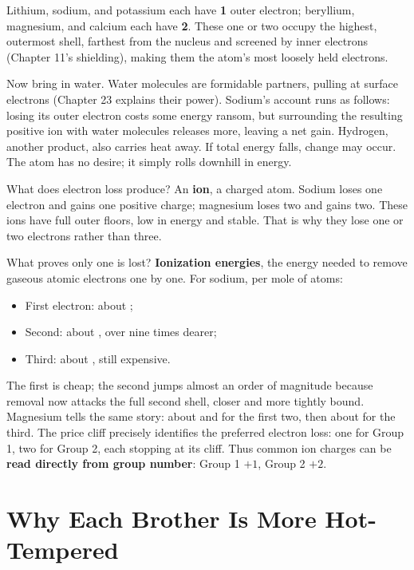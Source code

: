 Lithium, sodium, and potassium each have \textbf{1} outer electron; beryllium, magnesium, and calcium each have \textbf{2}. These one or two occupy the highest, outermost shell, farthest from the nucleus and screened by inner electrons (Chapter 11's shielding), making them the atom's most loosely held electrons.

Now bring in water. Water molecules are formidable partners, pulling at surface electrons (Chapter 23 explains their power). Sodium's account runs as follows: losing its outer electron costs some energy ransom, but surrounding the resulting positive ion with water molecules releases more, leaving a net gain. Hydrogen, another product, also carries heat away. If total energy falls, change may occur. The atom has no desire; it simply rolls downhill in energy.

What does electron loss produce? An \textbf{ion}, a charged atom. Sodium loses one electron and gains one positive charge; magnesium loses two and gains two. These ions have full outer floors, low in energy and stable. That is why they lose one or two electrons rather than three.

\begin{qiaoliang}
What proves only one is lost? \textbf{Ionization energies}, the energy needed to remove gaseous atomic electrons one by one. For sodium, per mole of atoms:
\begin{itemize}[itemsep=1pt]
\item First electron: about ;
\item Second: about , over nine times dearer;
\item Third: about , still expensive.
\end{itemize}
The first is cheap; the second jumps almost an order of magnitude because removal now attacks the full second shell, closer and more tightly bound. Magnesium tells the same story: about  and  for the first two, then about  for the third. The price cliff precisely identifies the preferred electron loss: one for Group 1, two for Group 2, each stopping at its cliff. Thus common ion charges can be \textbf{read directly from group number}: Group 1 $+1$, Group 2 $+2$.
\end{qiaoliang}

\section{Why Each Brother Is More Hot-Tempered}

